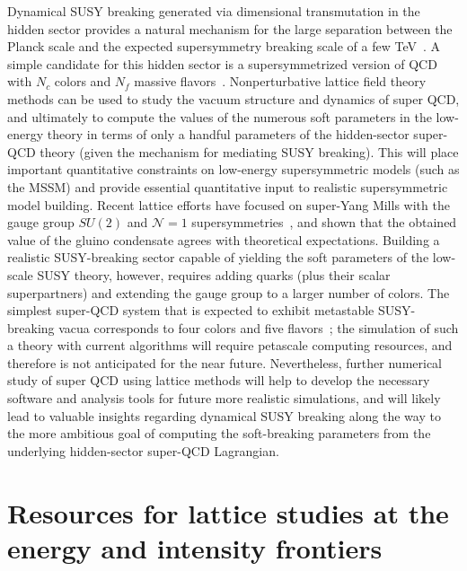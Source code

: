 \begin{itemize}
Dynamical SUSY breaking generated via dimensional transmutation in the hidden sector provides a natural mechanism for the large separation between the Planck scale and the expected supersymmetry breaking scale of a few TeV~\cite{Witten:1981nf}.  A simple candidate for this hidden sector is a supersymmetrized version of QCD with $N_c$ colors and $N_f$ massive flavors~\cite{Intriligator:2006dd}.  Nonperturbative lattice field theory methods can be used to study the vacuum structure and dynamics of super QCD, and ultimately to compute the values of the numerous soft parameters in the low-energy theory in terms of only a handful parameters of the hidden-sector super-QCD theory (given the mechanism for mediating SUSY breaking).  This will place important quantitative constraints on low-energy supersymmetric models (such as the MSSM) and provide essential quantitative input to realistic supersymmetric model building.  Recent lattice efforts have focused on super-Yang Mills with the gauge group $SU(2)$ and ${\mathcal N}=1$ supersymmetries~\cite{Giedt:2008xm,Endres:2009yp,Demmouche:2010sf}, and shown that the obtained value of the gluino condensate agrees with theoretical expectations.  Building a realistic SUSY-breaking sector capable of yielding the soft parameters of the low-scale SUSY theory, however, requires adding quarks (plus their scalar superpartners) and extending the gauge group to a larger number of colors.  The simplest super-QCD system that is expected to exhibit metastable SUSY-breaking vacua corresponds to four colors and five flavors~\cite{Intriligator:2006dd};  the simulation of such a theory with current algorithms will require petascale computing resources, and therefore is not anticipated for the near future.  Nevertheless, further numerical study of super QCD using lattice methods will help to develop the necessary software and analysis tools for future more realistic simulations, and will likely lead to valuable insights regarding dynamical SUSY breaking along the way to the more ambitious goal of computing the soft-breaking parameters from the underlying hidden-sector super-QCD Lagrangian.

\end{itemize}

\section{Resources for lattice studies at the energy and intensity frontiers}
\label{sec:lqcd:resources}

